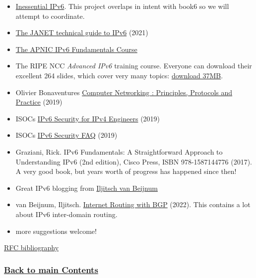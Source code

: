 \documentclass[
]{article}
\begin{document}
\begin{itemize}
\item
  \href{https://docs.google.com/document/d/1WohukYWdlFcEaSm-SQtX5Zgrkr-FZiZnfhlvoFi5Bl0/edit}{Inessential
  IPv6}. This project overlaps in intent with book6 so we will attempt
  to coordinate.
\item
  \href{https://repository.jisc.ac.uk/8349/1/janet-ipv6-technical-guide.pdf}{The
  JANET technical guide to IPv6} (2021)
\item
  \href{https://academy.apnic.net/en/course/ipv6-fundamentals}{The APNIC
  IPv6 Fundamentals Course}
\item
  The RIPE NCC \emph{Advanced IPv6} training course. Everyone can
  download their excellent 264 slides, which cover very many topics:
  \href{https://www.ripe.net/documents/3822/AdvancedIPv6-Slides_xDUF4U9.pdf}{download
  37MB}.
\item
  Olivier Bonaventure\textquotesingle s
  \href{https://beta.computer-networking.info/syllabus/default/protocols/ipv6.html\#ip-version-6}{Computer
  Networking : Principles, Protocols and Practice} (2019)
\item
  ISOC\textquotesingle s
  \href{https://www.internetsociety.org/resources/deploy360/ipv6/security/ipv4-engineers/}{IPv6
  Security for IPv4 Engineers} (2019)
\item
  ISOC\textquotesingle s
  \href{https://www.internetsociety.org/deploy360/ipv6/security/faq/}{IPv6
  Security FAQ} (2019)
\item
  Graziani, Rick. IPv6 Fundamentals: A Straightforward Approach to
  Understanding IPv6 (2nd edition), Cisco Press, ISBN 978-1587144776
  (2017). A very good book, but years\textquotesingle{} worth of
  progress has happened since then!
\item
  Great IPv6 blogging from \href{https://ipv6.iljitsch.com/}{Iljitsch
  van Beijnum}
\item
  van Beijnum, Iljitsch.
  \href{https://www.iljitsch.com/2022/11-18-new-e-book-internet-routing-with-bgp.html}{Internet
  Routing with BGP} (2022). This contains a lot about IPv6 inter-domain
  routing.
\item
  more suggestions welcome!
\end{itemize}

\hyperref[rfc-bibliography]{RFC bibliography}

\subsubsection{\texorpdfstring{\hyperref[list-of-contents]{Back to main
Contents}}{Back to main Contents}}\label{back-to-main-contents-10}
\end{document}
